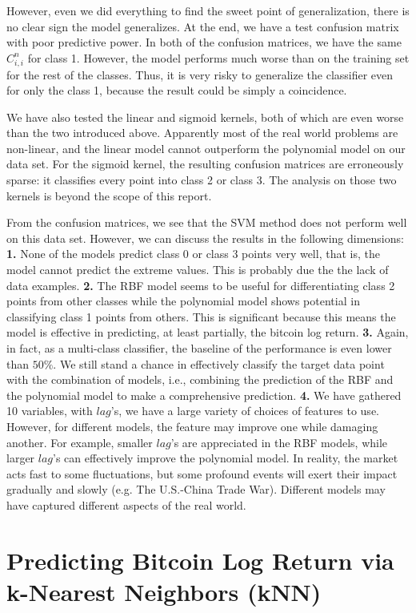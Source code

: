 \documentclass[9pt,twocolumn,twoside]{ilcss}
\begin{document}
However, even we did everything to find the sweet point of generalization, there is no clear sign the model generalizes. At the end, we have a test confusion matrix with poor predictive power. In both of the confusion matrices, we have the same $C_{i,i}^n$ for class 1. However, the model performs much worse than on the training set for the rest of the classes. Thus, it is very risky to generalize the classifier even for only the class 1, because the result could be simply a coincidence.

We have also tested the linear and sigmoid kernels, both of which are even worse than the two introduced above. Apparently most of the real world problems are non-linear, and the linear model cannot outperform the polynomial model on our data set. For the sigmoid kernel, the resulting confusion matrices are erroneously sparse: it classifies every point into class 2 or class 3. The analysis on those two kernels is beyond the scope of this report.

From the confusion matrices, we see that the SVM method does not perform well on this data set. However, we can discuss the results in the following dimensions: \textbf{1.} None of the models predict class 0 or class 3 points very well, that is, the model cannot predict the extreme values. This is probably due the the lack of data examples. \textbf{2.} The RBF model seems to be useful for differentiating class 2 points from other classes while the polynomial model shows potential in classifying class 1 points from others. This is significant because this means the model is effective in predicting, at least partially, the bitcoin log return. \textbf{3.} Again, in fact, as a multi-class classifier, the baseline of the performance is even lower than $50\%$. We still stand a chance in effectively classify the target data point with the combination of models, i.e., combining the prediction of the RBF and the polynomial model to make a comprehensive prediction. \textbf{4.} We have gathered 10 variables, with $lag$'s, we have a large variety of choices of features to use. However, for different models, the feature may improve one while damaging another. For example, smaller $lag$'s are appreciated in the RBF models, while larger $lag$'s can effectively improve the polynomial model. In reality, the market acts fast to some fluctuations, but some profound events will exert their impact gradually and slowly (e.g. The U.S.-China Trade War). Different models may have captured different aspects of the real world.

\section{Predicting Bitcoin Log Return via k-Nearest Neighbors (kNN)}
\end{document}

